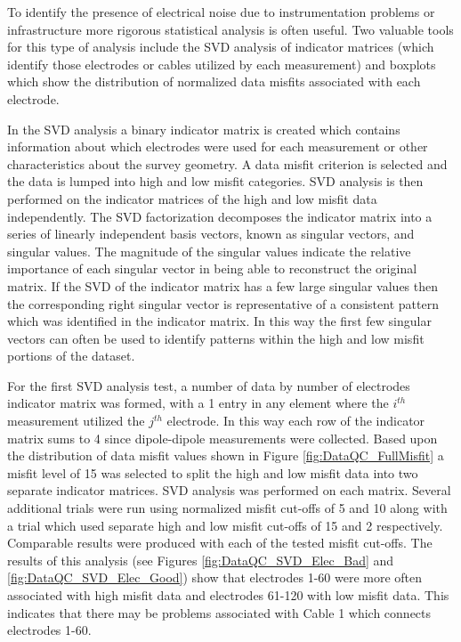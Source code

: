 \documentclass[final,authoryear,5p,times,twocolumn]{elsarticle}
\begin{document}
To identify the presence of electrical noise due to instrumentation problems or infrastructure more rigorous statistical analysis is often useful. Two valuable tools for this type of analysis include the SVD analysis of indicator matrices (which identify those electrodes or cables utilized by each measurement) and boxplots which show the distribution of normalized data misfits associated with each electrode.

In the SVD analysis a binary indicator matrix is created which contains information about which electrodes were used for each measurement or other characteristics about the survey geometry. A data misfit criterion is selected and the data is lumped into high and low misfit categories. SVD analysis is then performed on the indicator matrices of the high and low misfit data independently. The SVD factorization decomposes the indicator matrix into a series of linearly independent basis vectors, known as singular vectors, and singular values. The magnitude of the singular values indicate the relative importance of each singular vector in being able to reconstruct the original matrix. If the SVD of the indicator matrix has a few large singular values then the corresponding right singular vector is representative of a consistent pattern which was identified in the indicator matrix. In this way the first few singular vectors can often be used to identify patterns within the high and low misfit portions of the dataset.

For the first SVD analysis test, a number of data by number of electrodes indicator matrix was formed, with a 1 entry in any element where the $i^{th}$ measurement utilized the $j^{th}$ electrode. In this way each row of the indicator matrix sums to 4 since dipole-dipole measurements were collected. Based upon the distribution of data misfit values shown in Figure \ref{fig:DataQC_FullMisfit} a misfit level of 15 was selected to split the high and low misfit data into two separate indicator matrices. SVD analysis was performed on each matrix. Several additional trials were run using normalized misfit cut-offs of 5 and 10 along with a trial which used separate high and low misfit cut-offs of 15 and 2 respectively. Comparable results were produced with each of the tested misfit cut-offs. The results of this analysis (see Figures \ref{fig:DataQC_SVD_Elec_Bad} and \ref{fig:DataQC_SVD_Elec_Good}) show that electrodes 1-60 were more often associated with high misfit data and electrodes 61-120 with low misfit data. This indicates that there may be problems associated with Cable 1 which connects electrodes 1-60.
\end{document}
